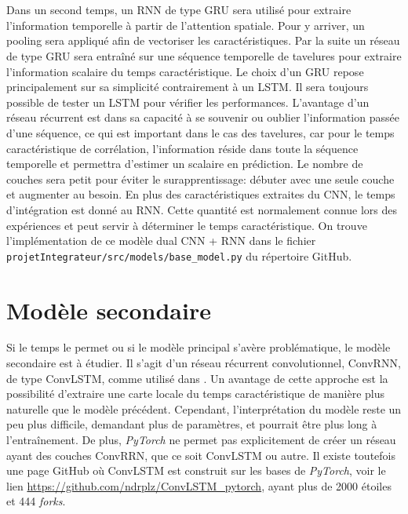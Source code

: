 \documentclass[MSc,french]{ulthese}
\begin{document}
\\ \\
Dans un second temps, un RNN de type GRU sera utilisé pour extraire l'information temporelle à partir de l'attention spatiale. Pour y arriver, un pooling sera appliqué afin de vectoriser les caractéristiques. Par la suite un réseau de type GRU sera entraîné sur une séquence temporelle de tavelures pour extraire l'information scalaire du temps caractéristique. Le choix d'un GRU repose principalement sur sa simplicité contrairement à un LSTM. Il sera toujours possible de tester un LSTM pour vérifier les performances. L'avantage d'un réseau récurrent est dans sa capacité à se souvenir ou oublier l'information passée d’une séquence, ce qui est important dans le cas des tavelures, car pour le temps caractéristique de corrélation, l'information réside dans toute la séquence temporelle et permettra d'estimer un scalaire en prédiction. Le nombre de couches sera petit pour éviter le surapprentissage: débuter avec une seule couche et augmenter au besoin. En plus des caractéristiques extraites du CNN, le temps d'intégration est donné au RNN. Cette quantité est normalement connue lors des expériences et peut servir à déterminer le temps caractéristique. On trouve l'implémentation de ce modèle dual CNN + RNN dans le fichier \texttt{projetIntegrateur/src/models/base\_model.py} du répertoire GitHub.
\section{Modèle secondaire}
Si le temps le permet ou si le modèle principal s'avère problématique, le modèle secondaire est à étudier. Il s'agit d'un réseau récurrent convolutionnel, ConvRNN, de type ConvLSTM, comme utilisé dans \cite{kaler_deep_2023}. Un avantage de cette approche est la possibilité d'extraire une carte locale du temps caractéristique de manière plus naturelle que le modèle précédent. Cependant, l'interprétation du modèle reste un peu plus difficile, demandant plus de paramètres, et pourrait être plus long à l'entraînement. De plus, \textit{PyTorch} ne permet pas explicitement de créer un réseau ayant des couches ConvRRN, que ce soit ConvLSTM ou autre. Il existe toutefois une page GitHub où ConvLSTM est construit sur les bases de \textit{PyTorch}, voir le lien \url{https://github.com/ndrplz/ConvLSTM_pytorch}, ayant plus de 2000 étoiles et 444 \textit{forks}.
\end{document}
